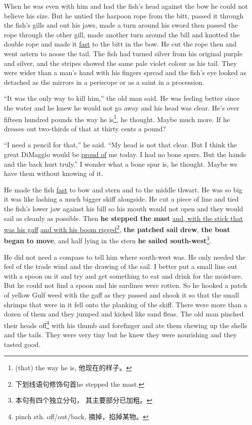 When he was even with him and had the fish's head against the bow he could
not believe his size. But he \gls{untied} the harpoon rope from the bitt,
passed it through the fish's gills and out his jaws, made a turn around his
\gls{sword} then passed the rope through the other gill, made another turn
around the bill and knotted the double rope and made it \uline{fast} to the bitt in
the bow. He cut the rope then and went astern to noose the tail. The fish
had turned silver from his \gls{original} purple and silver, and the stripes
showed the same pale \gls{violet} colour as his tail. They were wider than a
man's hand with his fingers spread and the fish's eye looked as
\gls{detached} as the mirrors in a \gls{periscope} or as a \gls{saint} in a
\gls{procession}.

``It was the only way to kill him,'' the old man said. He was feeling better
since the water and he knew he would not go away and his head was clear.
He's over fifteen hundred pounds the way he is\footnote{(that) the way he
  is, 他现在的样子。}, he thought. Maybe much more. If he dresses out
two-thirds of that at thirty cents a pound?

``I need a pencil for that,'' he said. ``My head is not that clear. But I
think the great DiMaggio would be \uline{proud of} me today. I had no bone spurs.
But the hands and the back hurt truly.'' I wonder what a bone spur is, he
thought. Maybe we have them without knowing of it.

He made the fish \uline{fast} to bow and stern and to the middle thwart. He was so
big it was like lashing a much bigger skiff alongside. He cut a piece of
line and tied the fish's lower jaw against his bill so his mouth would not
open and they would sail as cleanly as possible. Then \textbf{he stepped the
  mast} \uline{and, with the stick that was his gaff} \uline{and with his
  \gls{boom} rigged}\footnote{下划线语句修饰句首he stepped the mast.},
\textbf{the patched sail drew}, \textbf{the boat began to move}, and half
lying in the stern \textbf{he sailed south-west}\footnote{本句有四个独立分句，
  其主要部分已加粗。}.

He did not need a \gls{compass} to tell him where south-west was. He only
needed the feel of the trade wind and the drawing of the sail. I better put
a small line out with a spoon on it and try and get something to eat and
drink for the \gls{moisture}. But he could not find a spoon and his sardines
were \gls{rotten}. So he hooked a patch of yellow Gulf weed with the gaff as
they passed and shook it so that the small shrimps that were in it fell onto
the planking of the skiff. There were more than a dozen of them and they
jumped and kicked like sand \glspl{flea}. The old man \gls{pinched} their
heads off\footnote{pinch sth. off/out/back, 摘掉，掐掉某物。} with his thumb
and forefinger and ate them chewing up the shells and the tails. They were
very tiny but he knew they were \gls{nourishing} and they tasted good.


